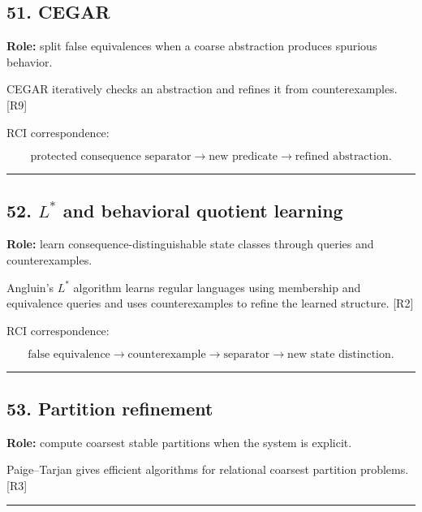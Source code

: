 \documentclass[
]{article}
\begin{document}
\subsection{51. CEGAR}\label{cegar}

\textbf{Role:} split false equivalences when a coarse abstraction
produces spurious behavior.

CEGAR iteratively checks an abstraction and refines it from
counterexamples. {[}R9{]}

RCI correspondence:

\[
\boxed{
\text{protected consequence separator}
\to
\text{new predicate}
\to
\text{refined abstraction}.
}
\]

\begin{center}\rule{0.5\linewidth}{0.5pt}\end{center}

\subsection{\texorpdfstring{52. \(L^*\) and behavioral quotient
learning}{52. L\^{}* and behavioral quotient learning}}\label{l-and-behavioral-quotient-learning}

\textbf{Role:} learn consequence-distinguishable state classes through
queries and counterexamples.

Angluin's \(L^*\) algorithm learns regular languages using membership
and equivalence queries and uses counterexamples to refine the learned
structure. {[}R2{]}

RCI correspondence:

\[
\boxed{
\text{false equivalence}
\to
\text{counterexample}
\to
\text{separator}
\to
\text{new state distinction}.
}
\]

\begin{center}\rule{0.5\linewidth}{0.5pt}\end{center}

\subsection{53. Partition refinement}\label{partition-refinement}

\textbf{Role:} compute coarsest stable partitions when the system is
explicit.

Paige--Tarjan gives efficient algorithms for relational coarsest
partition problems. {[}R3{]}

\begin{center}\rule{0.5\linewidth}{0.5pt}\end{center}
\end{document}

